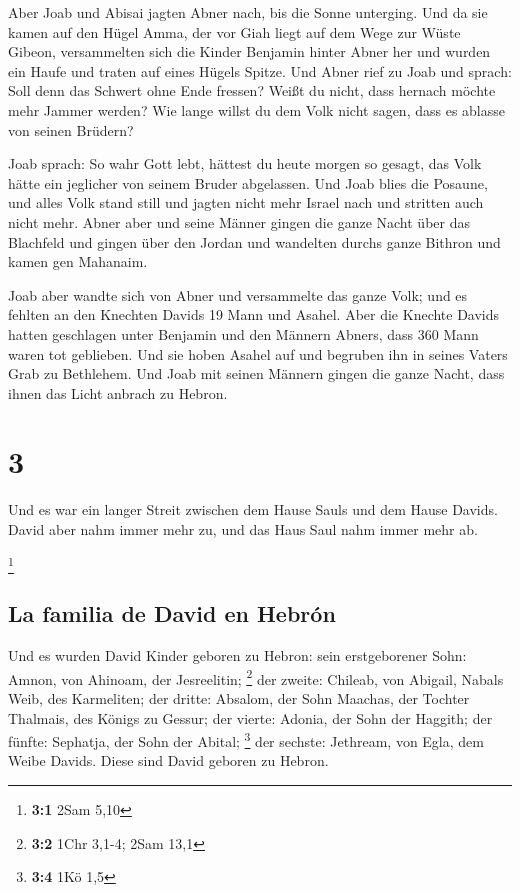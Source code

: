  Aber Joab und Abisai jagten Abner nach, bis die Sonne
unterging. Und da sie kamen auf den Hügel Amma, der vor Giah liegt auf
dem Wege zur Wüste Gibeon,  versammelten sich die Kinder
Benjamin hinter Abner her und wurden ein Haufe und traten auf eines
Hügels Spitze.  Und Abner rief zu Joab und sprach: Soll
denn das Schwert ohne Ende fressen? Weißt du nicht, dass hernach möchte
mehr Jammer werden? Wie lange willst du dem Volk nicht sagen, dass es
ablasse von seinen Brüdern?

 Joab sprach: So wahr Gott lebt, hättest du heute morgen
so gesagt, das Volk hätte ein jeglicher von seinem Bruder abgelassen.
 Und Joab blies die Posaune, und alles Volk stand still
und jagten nicht mehr Israel nach und stritten auch nicht mehr.
 Abner aber und seine Männer gingen die ganze Nacht über
das Blachfeld und gingen über den Jordan und wandelten durchs ganze
Bithron und kamen gen Mahanaim.

 Joab aber wandte sich von Abner und versammelte das
ganze Volk; und es fehlten an den Knechten Davids 19 Mann und Asahel.
 Aber die Knechte Davids hatten geschlagen unter Benjamin
und den Männern Abners, dass 360 Mann waren tot geblieben.
 Und sie hoben Asahel auf und begruben ihn in seines
Vaters Grab zu Bethlehem. Und Joab mit seinen Männern gingen die ganze
Nacht, dass ihnen das Licht anbrach zu Hebron.

\hypertarget{section-2}{%
\section{3}\label{section-2}}

 Und es war ein langer Streit zwischen dem Hause Sauls und
dem Hause Davids. David aber nahm immer mehr zu, und das Haus Saul nahm
immer mehr ab.

\footnote{\textbf{3:1} 2Sam 5,10}

\hypertarget{la-familia-de-david-en-hebruxf3n}{%
\subsection{La familia de David en
Hebrón}\label{la-familia-de-david-en-hebruxf3n}}

 Und es wurden David Kinder geboren zu Hebron: sein
erstgeborener Sohn: Amnon, von Ahinoam, der Jesreelitin; \footnote{\textbf{3:2}
  1Chr 3,1-4; 2Sam 13,1}  der zweite: Chileab, von
Abigail, Nabals Weib, des Karmeliten; der dritte: Absalom, der Sohn
Maachas, der Tochter Thalmais, des Königs zu Gessur;  der
vierte: Adonia, der Sohn der Haggith; der fünfte: Sephatja, der Sohn der
Abital; \footnote{\textbf{3:4} 1Kö 1,5}  der sechste:
Jethream, von Egla, dem Weibe Davids. Diese sind David geboren zu
Hebron.

